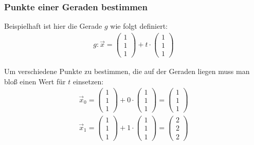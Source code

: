 \subsubsection{Punkte einer Geraden bestimmen}
\begin{flushleft}
Beispielhaft ist hier die Gerade $g$ wie folgt definiert:
\begin{align}
    g\colon\vec{x}=\begin{pmatrix} 1 \\ 1 \\ 1 \end{pmatrix}+t\cdot\begin{pmatrix} 1 \\ 1 \\ 1 \end{pmatrix}
\end{align}

Um verschiedene Punkte zu bestimmen, die auf der Geraden liegen muss man bloß einen Wert für $t$ einsetzen:
\begin{align}
    \vec{x}_0=\begin{pmatrix} 1 \\ 1 \\ 1 \end{pmatrix}+0\cdot\begin{pmatrix} 1 \\ 1 \\ 1 \end{pmatrix}=\begin{pmatrix} 1 \\ 1 \\ 1 \end{pmatrix} \\
    \vec{x}_1=\begin{pmatrix} 1 \\ 1 \\ 1 \end{pmatrix}+1\cdot\begin{pmatrix} 1 \\ 1 \\ 1 \end{pmatrix}=\begin{pmatrix} 2 \\ 2 \\ 2 \end{pmatrix}
\end{align}
\end{flushleft}


